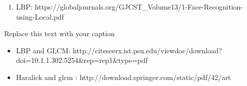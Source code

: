 \begin{enumerate}
\item LBP: https://globaljournals.org/GJCST_Volume13/1-Face-Recognition-using-Local.pdf
\end{enumerate}Replace this text with your caption
\begin{itemize}
\item LBP and GLCM: http://citeseerx.ist.psu.edu/viewdoc/download?doi=10.1.1.302.5254&rep=rep1&type=pdf
\end{itemize}    
\begin{itemize}
\item Haralick and glcm : http://download.springer.com/static/pdf/42/art%
\end{itemize}
